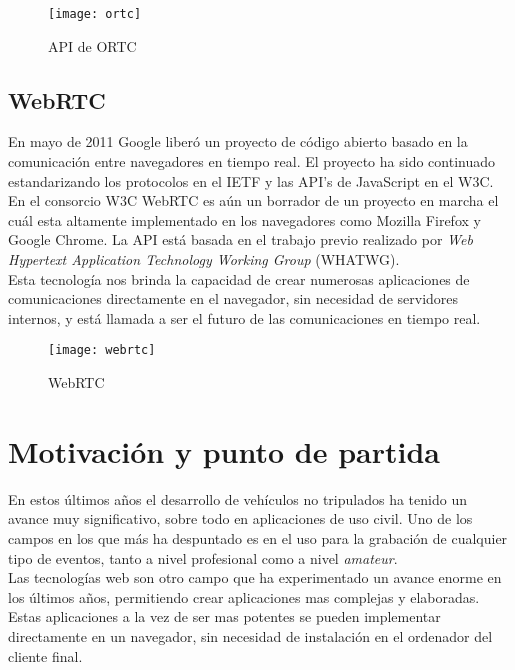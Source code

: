 \begin{figure}[htb]
\centering
\texttt{[image: ortc]}
\caption{API de ORTC}
\label{fig:ortc}
\end{figure}


\subsection{WebRTC}

En mayo de 2011 Google liberó un proyecto de código abierto basado en la comunicación entre navegadores en tiempo real. El proyecto ha sido continuado estandarizando los protocolos en el IETF y las API's de JavaScript en el W3C.\\

En el consorcio W3C WebRTC es aún un borrador de un proyecto en marcha el cuál esta altamente implementado en los navegadores como Mozilla Firefox y Google Chrome. La API está basada en el trabajo previo realizado por \emph{Web Hypertext Application Technology Working Group} (WHATWG).\\

Esta tecnología nos brinda la capacidad de crear numerosas aplicaciones de comunicaciones directamente en el navegador, sin necesidad de servidores internos, y está llamada a ser el futuro de las comunicaciones en tiempo real.\\

\begin{figure}[htb]
\centering
\texttt{[image: webrtc]}
\caption{WebRTC}
\label{fig:webrtc}
\end{figure}



\section{Motivación y punto de partida}

En estos últimos años el desarrollo de vehículos no tripulados ha tenido un avance muy significativo, sobre todo en aplicaciones de uso civil. Uno de los campos en los que más ha despuntado es en el uso para la grabación de cualquier tipo de eventos, tanto a nivel profesional como a nivel \emph{amateur}.\\

Las tecnologías web son otro campo que ha experimentado un avance enorme en los últimos años, permitiendo crear aplicaciones mas complejas y elaboradas. Estas aplicaciones a la vez de ser mas potentes se pueden implementar directamente en un navegador, sin necesidad de instalación en el ordenador del cliente final.\\


